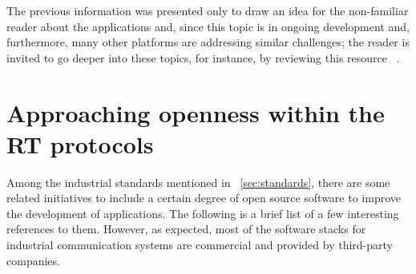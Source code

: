 The previous information was presented only to draw an idea for the non-familiar reader about the applications and, since this topic is in ongoing development 
and, furthermore, many other platforms are addressing similar challenges; the reader is invited
to go deeper into these topics, for instance, by reviewing this resource ~\cite{middleware_industrial}. %

\section{Approaching openness within the RT protocols}\label{sec:openness}

Among the industrial standards mentioned in ~\ref{sec:standards}, there are some related initiatives to include a certain degree of open source
software to improve the development of applications. The following is a brief list of a few interesting references to them. 
However, as expected, most of the software stacks
for industrial communication systems are commercial and provided by third-party companies. 

